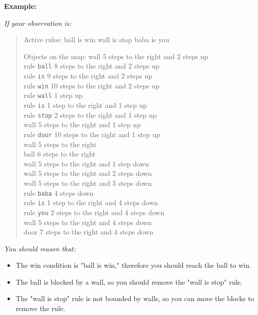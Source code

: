 \begin{GreenBox}
	\textbf{Example:}

	\textit{If your observation is:}
	\begin{quote}
		Active rules: ball is win wall is stop baba is you

		Objects on the map: wall 5 steps to the right and 2 steps up \\ rule \texttt{ball}
		8 steps to the right and 2 steps up \\ rule \texttt{is} 9 steps to the right
		and 2 steps up \\ rule \texttt{win} 10 steps to the right and 2 steps up \\ rule
		\texttt{wall} 1 step up \\ rule \texttt{is} 1 step to the right and 1 step up
		\\ rule \texttt{stop} 2 steps to the right and 1 step up \\ wall 5 steps to
		the right and 1 step up \\ rule \texttt{door} 10 steps to the right and 1 step
		up \\ wall 5 steps to the right \\ ball 6 steps to the right \\ wall 5 steps
		to the right and 1 step down \\ wall 5 steps to the right and 2 steps down \\
		wall 5 steps to the right and 3 steps down \\ rule \texttt{baba} 4 steps
		down \\ rule \texttt{is} 1 step to the right and 4 steps down \\ rule \texttt{you}
		2 steps to the right and 4 steps down \\ wall 5 steps to the right and 4
		steps down \\ door 7 steps to the right and 4 steps down \\
	\end{quote}

	\textit{You should reason that:}
	\begin{itemize}
		\item The win condition is "ball is win," therefore you should reach the
			ball to win.

		\item The ball is blocked by a wall, so you should remove the "wall is stop"
			rule.

		\item The "wall is stop" rule is not bounded by walls, so you can move the
			blocks to remove the rule.


\end{itemize}
\end{GreenBox}
